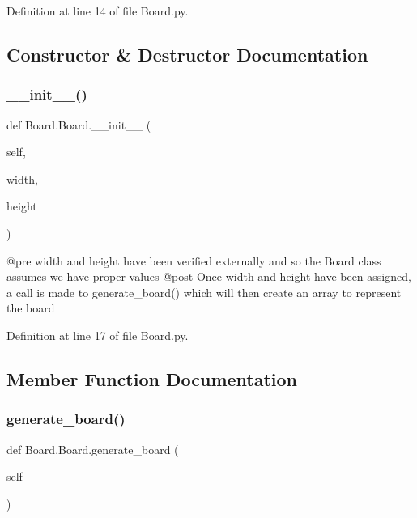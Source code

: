 Definition at line 14 of file Board.\+py.



\subsection{Constructor \& Destructor Documentation}
\mbox{\label{class_board_1_1_board_a4e5fe775dd732dca12ba2f24f5e33cd0}} 
\subsubsection{\texorpdfstring{\+\_\+\+\_\+init\+\_\+\+\_\+()}{\_\_init\_\_()}}
{\footnotesize\ttfamily def Board.\+Board.\+\_\+\+\_\+init\+\_\+\+\_\+ (\begin{DoxyParamCaption}\item[{}]{self,  }\item[{}]{width,  }\item[{}]{height }\end{DoxyParamCaption})}

\begin{DoxyVerb}@pre    width and height have been verified externally and so
the Board class assumes we have proper values
    @post   Once width and height have been assigned, a call is made to
generate_board() which will then create an array to represent the board
\end{DoxyVerb}
 

Definition at line 17 of file Board.\+py.



\subsection{Member Function Documentation}
\mbox{\label{class_board_1_1_board_a6c6aa64d586b48c8cbf7942a28ef4fba}} 
\subsubsection{\texorpdfstring{generate\+\_\+board()}{generate\_board()}}
{\footnotesize\ttfamily def Board.\+Board.\+generate\+\_\+board (\begin{DoxyParamCaption}\item[{}]{self }\end{DoxyParamCaption})}

